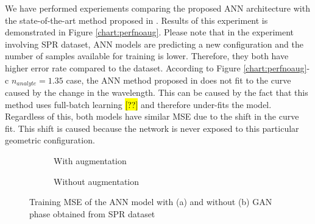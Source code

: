 \documentclass[draft, 10pt]{IEEEtran}
\begin{document}
We have performed experiements comparing the proposed ANN architecture with the state-of-the-art method proposed in \cite{paper0}. Results of this experiment is demonstrated in Figure \ref{chart:perfnoaug}. Please note that in the experiment involving SPR dataset, ANN models are predicting a new configuration and the number of samples available for training is lower. Therefore, they both have higher error rate compared to the \dszero{} dataset. According to Figure \ref{chart:perfnoaug}-c $n_{analyte} = 1.35$ case, the ANN method proposed in \cite{paper0} does not fit to the curve caused by the change in the wavelength. This can be caused by the fact that this method uses full-batch learning \hl{[??]} and therefore under-fits the model. Regardless of this, both models have similar MSE due to the shift in the curve fit. This shift is caused because the network is never exposed to this particular geometric configuration. 


\begin{figure*}
	\begin{subfigure}{.48\textwidth}
	\centering
	\caption{With augmentation}
	\end{subfigure}	
	\begin{subfigure}{.48\textwidth}
	\centering
	\caption{Without augmentation}
	\end{subfigure}
		
	\caption{Training MSE of the ANN model with (a) and without (b) GAN phase obtained from SPR dataset}
	\label{chart:trainingmse}
\end{figure*}
\end{document}
